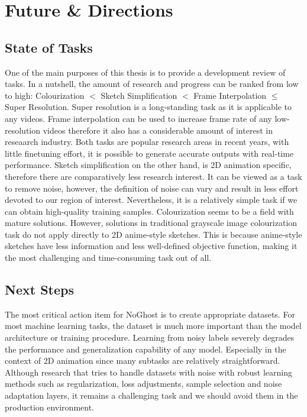 \chapter{Future \& Directions}
\label{chapterlabel7}

\section{State of Tasks}
One of the main purposes of this thesis is to provide a development review of tasks. In a nutshell, the amount of research and progress can be ranked from low to high: Colourization $<$ Sketch Simplification $<$ Frame Interpolation $\leq$ Super Resolution. Super resolution is a long-standing task as it is applicable to any videos. Frame interpolation can be used to increase frame rate of any low-resolution videos therefore it also has a considerable amount of interest in reseaarch industry. Both tasks are popular research areas in recent years, with little finetuning effort, it is possible to generate accurate outputs with real-time performance. Sketch simplification on the other hand, is 2D animation specific, therefore there are comparatively less research interest. It can be viewed as a task to remove noise, however, the definition of noise can vary and result in less effort devoted to our region of interest. Nevertheless, it is a relatively simple task if we can obtain high-quality training samples. Colourization seems to be a field with mature solutions. However, solutions in traditional grayscale image colourization task do not apply directly to 2D anime-style sketches. This is because anime-style sketches have less information and less well-defined objective function, making it the most challenging and time-consuming task out of all.

\section{Next Steps}

The most critical action item for NoGhost is to create appropriate datasets. For most machine learning tasks, the dataset is much more important than the model architecture or training procedure. Learning from noisy labels severely degrades the performance and generalization capability of any model. Especially in the context of 2D animation since many subtasks are relatively straightforward. Although research that tries to handle datasets with noise with robust learning methods such as regularization, loss adjustments, sample selection and noise adaptation layers\cite{songLearningNoisyLabels2022}, it remains a challenging task and we should avoid them in the production environment.

